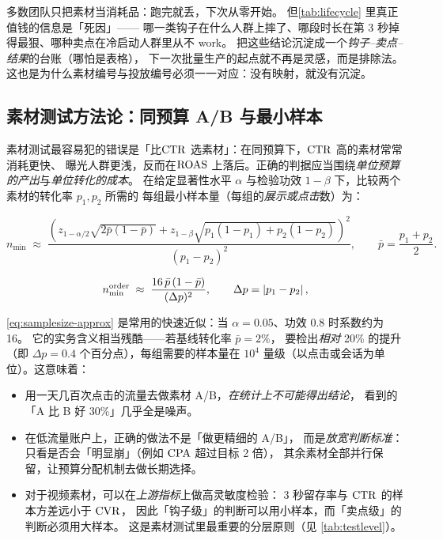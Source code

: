 \begin{insight}
多数团队只把素材当消耗品：跑完就丢，下次从零开始。
但\cref{tab:lifecycle} 里真正值钱的信息是「死因」——
哪一类钩子在什么人群上摔了、哪段时长在第 3 秒掉得最狠、哪种卖点在冷启动人群里从不 work。
把这些结论沉淀成一个\emph{钩子--卖点--结果}的台账（哪怕是表格），
下一次批量生产的起点就不再是灵感，而是排除法。
这也是为什么素材编号与投放编号必须一一对应：没有映射，就没有沉淀。
\end{insight}

\subsection{素材测试方法论：同预算 A/B 与最小样本}

素材测试最容易犯的错误是「比$\operatorname{CTR}$ 选素材」：在同预算下，$\operatorname{CTR}$ 高的素材常常消耗更快、
曝光人群更浅，反而在$\operatorname{ROAS}$ 上落后。正确的判据应当围绕\emph{单位预算的产出}与\emph{单位转化的成本}。
在给定显著性水平 $\alpha$ 与检验功效 $1-\beta$ 下，比较两个素材的转化率 $p_1, p_2$ 所需的
每组最小样本量（每组的\emph{展示或点击}数）为：

\begin{equation}
n_{\min} \;\approx\; \frac{\left(z_{1-\alpha/2}\sqrt{2\bar p(1-\bar p)}
+ z_{1-\beta}\sqrt{p_1(1-p_1)+p_2(1-p_2)}\right)^2}{(p_1-p_2)^2},
\qquad \bar p = \frac{p_1+p_2}{2}.
\label{eq:samplesize}
\end{equation}

\begin{equation}
n_{\min}^{\text{order}} \;\approx\; \frac{16\,\bar p\,(1-\bar p)}{(\Delta p)^2},
\qquad \Delta p = \left\lvert p_1-p_2 \right\rvert ,
\label{eq:samplesize-approx}
\end{equation}

\cref{eq:samplesize-approx} 是常用的快速近似：当 $\alpha=0.05$、功效 $0.8$ 时系数约为 16。
它的实务含义相当残酷——若基线转化率 $\bar p = 2\%$，
要检出\emph{相对} 20\% 的提升（即 $\Delta p = 0.4$ 个百分点），每组需要的样本量在
$10^4$ 量级（以点击或会话为单位）。这意味着：
\begin{itemize}
  \item 用一天几百次点击的流量去做素材 A/B，\emph{在统计上不可能得出结论}，
        看到的「A 比 B 好 30\%」几乎全是噪声。
  \item 在低流量账户上，正确的做法不是「做更精细的 A/B」，
        而是\emph{放宽判断标准}：只看是否会「明显崩」（例如 $\operatorname{CPA}$ 超过目标 2 倍），
        其余素材全部并行保留，让预算分配机制去做长期选择。
  \item 对于视频素材，可以在\emph{上游指标}上做高灵敏度检验：
        3 秒留存率与 $\operatorname{CTR}$ 的样本方差远小于 $\operatorname{CVR}$，
        因此「钩子级」的判断可以用小样本，而「卖点级」的判断必须用大样本。
        这是素材测试里最重要的分层原则（见 \cref{tab:testlevel}）。
\end{itemize}

